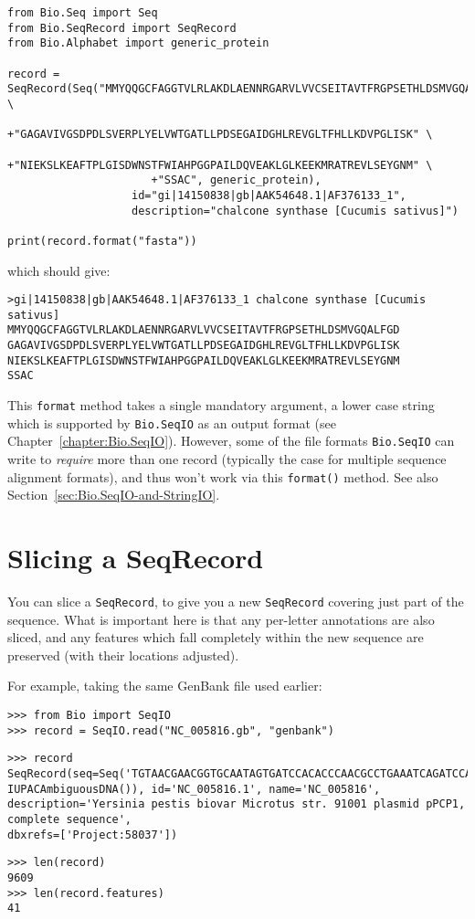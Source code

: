 \begin{verbatim}
from Bio.Seq import Seq
from Bio.SeqRecord import SeqRecord
from Bio.Alphabet import generic_protein

record = SeqRecord(Seq("MMYQQGCFAGGTVLRLAKDLAENNRGARVLVVCSEITAVTFRGPSETHLDSMVGQALFGD" \
                      +"GAGAVIVGSDPDLSVERPLYELVWTGATLLPDSEGAIDGHLREVGLTFHLLKDVPGLISK" \
                      +"NIEKSLKEAFTPLGISDWNSTFWIAHPGGPAILDQVEAKLGLKEEKMRATREVLSEYGNM" \
                      +"SSAC", generic_protein),
                   id="gi|14150838|gb|AAK54648.1|AF376133_1",
                   description="chalcone synthase [Cucumis sativus]")

print(record.format("fasta"))
\end{verbatim}
\noindent which should give:
\begin{verbatim}
>gi|14150838|gb|AAK54648.1|AF376133_1 chalcone synthase [Cucumis sativus]
MMYQQGCFAGGTVLRLAKDLAENNRGARVLVVCSEITAVTFRGPSETHLDSMVGQALFGD
GAGAVIVGSDPDLSVERPLYELVWTGATLLPDSEGAIDGHLREVGLTFHLLKDVPGLISK
NIEKSLKEAFTPLGISDWNSTFWIAHPGGPAILDQVEAKLGLKEEKMRATREVLSEYGNM
SSAC
\end{verbatim}

This \verb|format| method takes a single mandatory argument, a lower case string which is
supported by \verb|Bio.SeqIO| as an output format (see Chapter~\ref{chapter:Bio.SeqIO}).
However, some of the file formats \verb|Bio.SeqIO| can write to \emph{require} more than
one record (typically the case for multiple sequence alignment formats), and thus won't
work via this \verb|format()| method.  See also Section~\ref{sec:Bio.SeqIO-and-StringIO}.

\section{Slicing a SeqRecord}
\label{sec:SeqRecord-slicing}

You can slice a \verb|SeqRecord|, to give you a new \verb|SeqRecord| covering just
part of the sequence. What is important
here is that any per-letter annotations are also sliced, and any features which fall
completely within the new sequence are preserved (with their locations adjusted).

For example, taking the same GenBank file used earlier:

\begin{verbatim}
>>> from Bio import SeqIO
>>> record = SeqIO.read("NC_005816.gb", "genbank")
\end{verbatim}
\begin{verbatim}
>>> record
SeqRecord(seq=Seq('TGTAACGAACGGTGCAATAGTGATCCACACCCAACGCCTGAAATCAGATCCAGG...CTG',
IUPACAmbiguousDNA()), id='NC_005816.1', name='NC_005816',
description='Yersinia pestis biovar Microtus str. 91001 plasmid pPCP1, complete sequence',
dbxrefs=['Project:58037'])
\end{verbatim}
\begin{verbatim}
>>> len(record)
9609
>>> len(record.features)
41
\end{verbatim}



